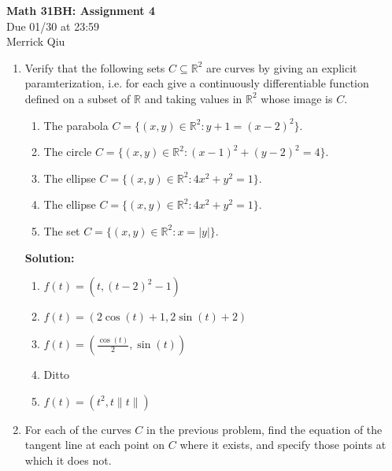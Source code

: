 \documentclass{report}
\newcommand{\solution}{\textbf{Solution: }}
\begin{document}
\begin{center}
	\huge{\bf Math 31BH: Assignment 4} \\
	Due 01/30 at 23:59 \\
	Merrick Qiu
\end{center}

\bigskip

\begin{enumerate}

	\item
	Verify that the following sets $C \subseteq \mathbb{R}^2$ are curves by giving an 
	explicit paramterization, i.e. for each 
	give a continuously differentiable function defined on a subset of $\mathbb{R}$ and
	taking values in $\mathbb{R}^2$ whose image is $C.$
	
	\begin{enumerate}
	
		\smallskip
		\item
		The parabola $C=\{(x,y) \in \mathbb{R}^2 \colon y+1=(x-2)^2\}.$
		
		\smallskip
		\item
		The circle $C=\{(x,y) \in \mathbb{R}^2 \colon (x-1)^2+(y-2)^2=4\}.$
		
		\smallskip
		\item
		The ellipse $C=\{(x,y) \in \mathbb{R}^2 \colon 4x^2+y^2=1\}.$
		
		\smallskip
		\item
		The ellipse $C=\{(x,y) \in \mathbb{R}^2 \colon 4x^2+y^2=1\}.$
		
		\smallskip
		\item
		The set $C=\{(x,y) \in \mathbb{R}^2 \colon x=|y|\}.$
	
	\end{enumerate}

	\solution 
	\begin{enumerate}
		\item $f(t) = (t, (t-2)^2-1)$
		\item $f(t) = (2\cos(t)+1, 2\sin(t)+2)$
		\item $f(t) = (\frac{\cos(t)}{2}, \sin(t))$
		\item Ditto 
		\item $f(t) = (t^2, t\|t\|)$
	\end{enumerate}
	
	\medskip
	\item
	For each of the curves $C$ in the previous problem, find the equation of the tangent line
	at each point on $C$ where it exists, and specify those points at which it does not.
	

\end{enumerate}
\end{document}
